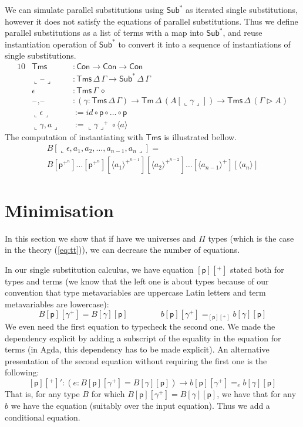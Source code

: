 \documentclass[sigplan,10pt,anonymous,review]{acmart}\settopmatter{printfolios=true,printccs=false,printacmref=false}
\newcommand{\ra}{\rightarrow}
\newcommand{\Tm}{\mathsf{Tm}}
\newcommand{\Con}{\mathsf{Con}}
\newcommand{\Sub}{\mathsf{Sub}}
\newcommand{\Tms}{\mathsf{Tms}}
\newcommand{\p}{\mathsf{p}}
\newcommand{\ext}{\mathop{\triangleright}}
\newcommand{\blank}{\mathord{\hspace{1pt}\text{--}\hspace{1pt}}} %
\begin{document}
We can simulate parallel substitutions using $\Sub^*$ as iterated single
substitutions, however it does not satisfy the equations of parallel
substitutions. Thus we define parallel substitutions as a list of terms with a
map into $\Sub^*$, and reuse instantiation operation of $\Sub^*$ to convert it
into a sequence of instantiations of single substitutions.
\begin{alignat*}{10}
  & \Tms && : \Con\ra\Con\ra\Con \\
  & \llcorner\blank\lrcorner && : \Tms\,\Delta\,\Gamma \to \Sub^*\,\Delta\,\Gamma \\
  & \epsilon && : \Tms\,\Gamma\,\diamond \\
  & \blank,\blank && : (\gamma:\Tms\,\Delta\,\Gamma)\ra\Tm\,\Delta\,(A[\llcorner\gamma\lrcorner])\ra\Tms\,\Delta\,(\Gamma\ext A) \\
  & \llcorner\epsilon\lrcorner && := id\circ\p\circ\dots\circ\p \\
  & \llcorner\gamma,a\lrcorner && := \llcorner\gamma\lrcorner^+\circ\langle a \rangle
\end{alignat*}
The computation of instantiating with $\Tms$ is illustrated bellow.
\begin{gather*}
  B[\llcorner\epsilon,a_1,a_2,\dots,a_{n-1},a_n\lrcorner] = \\
  B[\p^{+^n}]\dots[\p^{+^n}][\langle a_1 \rangle^{+^{n-1}}][\langle a_2 \rangle^{+^{n-2}}]\dots[\langle a_{n-1} \rangle^+][\langle a_n \rangle]
\end{gather*}

\section{Minimisation}
\label{sec:minimisation}

In this section we show that if have we universes and $\Pi$ types
(which is the case in the theory (\ref{eq:tt})), we can decrease the
number of equations.

In our single substitution calculus, we have equation $[\p][^+]$
stated both for types and terms (we know that the left one is about
types because of our convention that type metavariables are uppercase
Latin letters and term metavariables are lowercase):
\[
B[\p][\gamma^+] = B[\gamma][\p] \hspace{4em} b[\p][\gamma^+] =_{[\p][^+]} b[\gamma][\p]
\]
We even need the first equation to typecheck the second one. We made
the dependency explicit by adding a subscript of the equality in the
equation for terms (in Agda, this dependency has to be made
explicit). An alternative presentation of the second equation without
requiring the first one is the following:
\[
[\p][^+]' : (e : B[\p][\gamma^+] = B[\gamma][\p])\ra b[\p][\gamma^+] =_{e} b[\gamma][\p]
\]
That is, for any type $B$ for which $B[\p][\gamma^+] = B[\gamma][\p]$,
we have that for any $b$ we have the equation (suitably over the input
equation). Thus we add a conditional equation.
\end{document}

